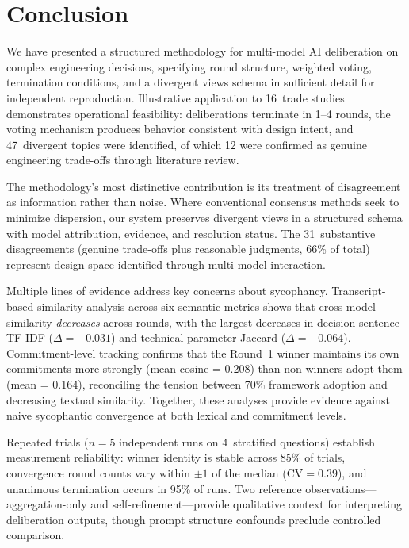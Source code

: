 \documentclass[11pt,a4paper]{article}
\begin{document}
\section{Conclusion}
\label{sec:conclusion}

We have presented a structured methodology for multi-model AI deliberation on complex engineering decisions, specifying round structure, weighted voting, termination conditions, and a divergent views schema in sufficient detail for independent reproduction. Illustrative application to 16~trade studies demonstrates operational feasibility: deliberations terminate in 1--4 rounds, the voting mechanism produces behavior consistent with design intent, and 47~divergent topics were identified, of which 12 were confirmed as genuine engineering trade-offs through literature review.

The methodology's most distinctive contribution is its treatment of disagreement as information rather than noise. Where conventional consensus methods seek to minimize dispersion, our system preserves divergent views in a structured schema with model attribution, evidence, and resolution status. The 31~substantive disagreements (genuine trade-offs plus reasonable judgments, 66\% of total) represent design space identified through multi-model interaction.

Multiple lines of evidence address key concerns about sycophancy. Transcript-based similarity analysis across six semantic metrics shows that cross-model similarity \emph{decreases} across rounds, with the largest decreases in decision-sentence TF-IDF ($\Delta = -0.031$) and technical parameter Jaccard ($\Delta = -0.064$). Commitment-level tracking confirms that the Round~1 winner maintains its own commitments more strongly (mean cosine = 0.208) than non-winners adopt them (mean = 0.164), reconciling the tension between 70\% framework adoption and decreasing textual similarity. Together, these analyses provide evidence against naive sycophantic convergence at both lexical and commitment levels.

Repeated trials ($n = 5$ independent runs on 4~stratified questions) establish measurement reliability: winner identity is stable across 85\% of trials, convergence round counts vary within $\pm 1$ of the median ($\text{CV} = 0.39$), and unanimous termination occurs in 95\% of runs. Two reference observations---aggregation-only and self-refinement---provide qualitative context for interpreting deliberation outputs, though prompt structure confounds preclude controlled comparison.
\end{document}
